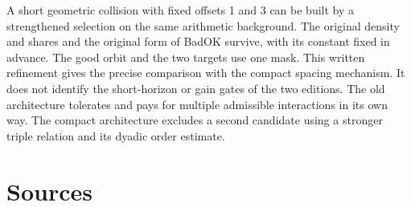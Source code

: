 \documentclass[12pt,letterpaper]{article}
\DeclareRobustCommand{\id}[1]{\mbox{\small\ttfamily #1}}
\begin{document}
A short geometric collision with fixed offsets 1 and 3 can be built by a strengthened selection on the same arithmetic background. The original density and shares and the original form of \id{BadOK} survive, with its constant fixed in advance. The good orbit and the two targets use one mask. This written refinement gives the precise comparison with the compact spacing mechanism. It does not identify the short-horizon or gain gates of the two editions. The old architecture tolerates and pays for multiple admissible interactions in its own way. The compact architecture excludes a second candidate using a stronger triple relation and its dyadic order estimate.

\section{Sources}
\end{document}
